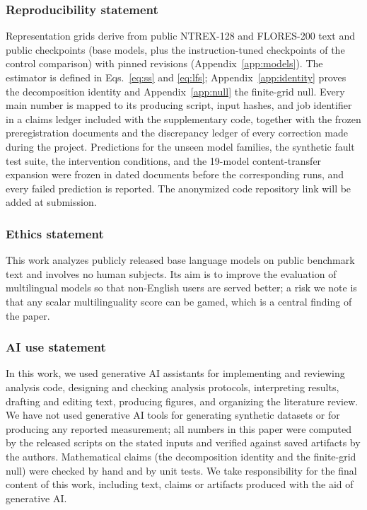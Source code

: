 \documentclass{article} %
\begin{document}
\subsubsection*{Reproducibility statement}
Representation grids derive from public NTREX-128 and FLORES-200 text and public checkpoints (base models, plus the instruction-tuned checkpoints of the control comparison) with pinned revisions (Appendix~\ref{app:models}). The estimator
is defined in Eqs.~\ref{eq:ss} and \ref{eq:lfs}; Appendix~\ref{app:identity}
proves the decomposition identity and Appendix~\ref{app:null} the finite-grid
null. Every main number is mapped to its producing script, input hashes,
and job identifier in a claims ledger included with the supplementary code,
together with the frozen preregistration documents and the discrepancy ledger
of every correction made during the project. Predictions for the unseen
model families, the synthetic fault test suite, the intervention conditions,
and the 19-model content-transfer expansion were frozen in dated documents
before the corresponding runs, and every failed prediction is reported. The anonymized code repository link will be added at submission.

\subsubsection*{Ethics statement}
This work analyzes publicly released base language models on public
benchmark text and involves no human subjects. Its aim is to improve the
evaluation of multilingual models so that non-English users are served
better; a risk we note is that any scalar multilinguality score can be gamed,
which is a central finding of the paper.

\subsubsection*{AI use statement}
In this work, we used generative AI assistants for implementing and reviewing analysis code, designing and checking analysis protocols, interpreting results, drafting and editing text, producing figures, and organizing the literature review. We have not used generative AI tools for generating
synthetic datasets or for producing any reported measurement; all numbers in
this paper were computed by the released scripts on the stated inputs and
verified against saved artifacts by the authors. Mathematical claims
(the decomposition identity and the finite-grid null) were checked by hand and
by unit tests. We take responsibility for the final content of this work,
including text, claims or artifacts produced with the aid of generative AI.
\end{document}
